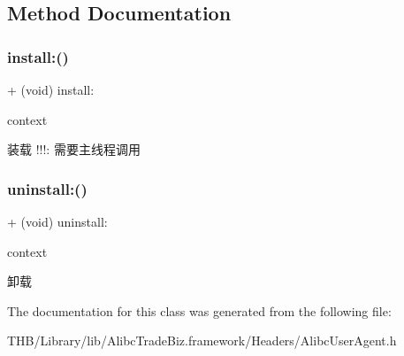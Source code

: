 \subsection{Method Documentation}
\mbox{\label{interface_alibc_user_agent_a169435dc28b33336ccad1f2483f2bb91}} 
\subsubsection{\texorpdfstring{install\+:()}{install:()}}
{\footnotesize\ttfamily + (void) install\+: \begin{DoxyParamCaption}\item[{(N\+S\+Dictionary $\ast$)}]{context }\end{DoxyParamCaption}}

装载 !!!\+: 需要主线程调用 \mbox{\label{interface_alibc_user_agent_a97408c5b7d051a854f5d83c14f492c47}} 
\subsubsection{\texorpdfstring{uninstall\+:()}{uninstall:()}}
{\footnotesize\ttfamily + (void) uninstall\+: \begin{DoxyParamCaption}\item[{(N\+S\+Dictionary $\ast$)}]{context }\end{DoxyParamCaption}}

卸载 

The documentation for this class was generated from the following file\+:\begin{DoxyCompactItemize}
\item 
T\+H\+B/\+Library/lib/\+Alibc\+Trade\+Biz.\+framework/\+Headers/Alibc\+User\+Agent.\+h\end{DoxyCompactItemize}
